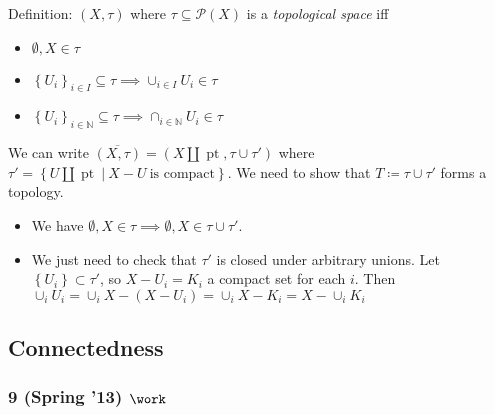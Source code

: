 \begin{solution}

\envlist

\begin{concept}

\envlist

Definition: \((X, \tau)\) where \(\tau \subseteq \mathcal P(X)\) is a
\emph{topological space} iff

\begin{itemize}
\tightlist
\item
  \(\emptyset, X \in \tau\)
\item
  \(\left\{{U_i}\right\}_{i\in I} \subseteq \tau \implies \cup_{i\in I} U_i \in \tau\)
\item
  \(\left\{{U_i}\right\}_{i\in {\mathbb{N}}} \subseteq \tau \implies \cap_{i\in {\mathbb{N}}} U_i \in \tau\)
\end{itemize}

\end{concept}

We can write
\(\overline{(X, \tau)} = (X {\coprod}{\operatorname{pt}}, \tau \cup\tau')\)
where
\(\tau' = \left\{{U{\coprod}{\operatorname{pt}}{~\mathrel{\Big|}~}X-U ~\text{is compact}}\right\}\).
We need to show that \(T \coloneqq\tau \cup\tau'\) forms a topology.

\begin{itemize}
\tightlist
\item
  We have
  \(\emptyset,X \in \tau \implies \emptyset, X \in \tau \cup\tau'\).
\item
  We just need to check that \(\tau'\) is closed under arbitrary unions.
  Let \(\left\{{U_i}\right\} \subset \tau'\), so \(X-U_i = K_i\) a
  compact set for each \(i\). Then
  \(\cup_{i} U_i = \cup_i X- (X-U_i)= \cup_i X - K_i = X - \cup_i K_i\)
\end{itemize}

\end{solution}

\hypertarget{connectedness}{%
\subsection{Connectedness}\label{connectedness}}

\hypertarget{spring-13-work}{%
\subsubsection{\texorpdfstring{9 (Spring '13)
\(\work\)}{9 (Spring '13) \textbackslash work}}\label{spring-13-work}}

